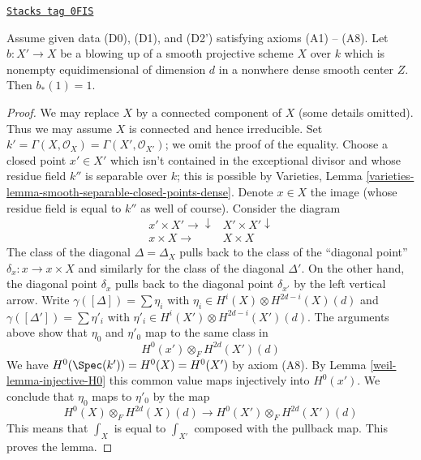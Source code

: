 \begin{lemma}
\label{weil-lemma-pushforward-blowup}
\href{https://stacks.math.columbia.edu/tag/0FIS}{\texttt{Stacks tag 0FIS}}

Assume given data (D0), (D1), and (D2') satisfying axioms (A1) -- (A8).
Let $b : X' \to X$ be a blowing up of a smooth projective scheme $X$
over $k$ which is nonempty equidimensional of dimension $d$
in a nonwhere dense smooth center $Z$. Then $b_*(1) = 1$.
\end{lemma}

\begin{proof}

We may replace $X$ by a connected component of $X$ (some details
omitted). Thus we may assume $X$ is connected and hence irreducible.
Set $k' = \Gamma(X, \mathcal{O}_X) = \Gamma(X', \mathcal{O}_{X'})$;
we omit the proof of the equality. Choose a closed point $x' \in X'$
which isn't contained in the exceptional divisor and whose residue field
$k''$ is separable over $k$; this is possible by
Varieties, Lemma \ref{varieties-lemma-smooth-separable-closed-points-dense}.
Denote $x \in X$ the image (whose residue field is equal to $k''$
as well of course). Consider the diagram
$$
\begin{array}{cc}x' \times X' \longrightarrow\downarrow & X' \times X' \downarrow \\ x \times X \longrightarrow & X \times X\end{array}
$$
The class of the diagonal $\Delta = \Delta_X$ pulls back to the class of the
``diagonal point'' $\delta_x : x \to x \times X$ and similarly for the class of
the diagonal $\Delta'$. On the other hand, the diagonal point $\delta_x$
pulls back to the diagonal point $\delta_{x'}$ by the left vertical arrow.
Write $\gamma([\Delta]) = \sum \eta_i$ with
$\eta_i \in H^i(X) \otimes H^{2d - i}(X)(d)$ and
$\gamma([\Delta']) = \sum \eta'_i$ with
$\eta'_i \in H^i(X') \otimes H^{2d - i}(X')(d)$.
The arguments above show that $\eta_0$ and $\eta'_0$ map to the same
class in
$$
H^0(x') \otimes_F H^{2d}(X')(d)
$$
We have $H^0(\Spec(k')) = H^0(X) = H^0(X')$ by axiom (A8).
By Lemma \ref{weil-lemma-injective-H0} this common value maps injectively
into $H^0(x')$. We conclude that $\eta_0$ maps to $\eta'_0$ by the map
$$
H^0(X) \otimes_F H^{2d}(X)(d)
\longrightarrow
H^0(X') \otimes_F H^{2d}(X')(d)
$$
This means that $\int_X$ is equal to $\int_{X'}$ composed with
the pullback map. This proves the lemma.
\end{proof}

